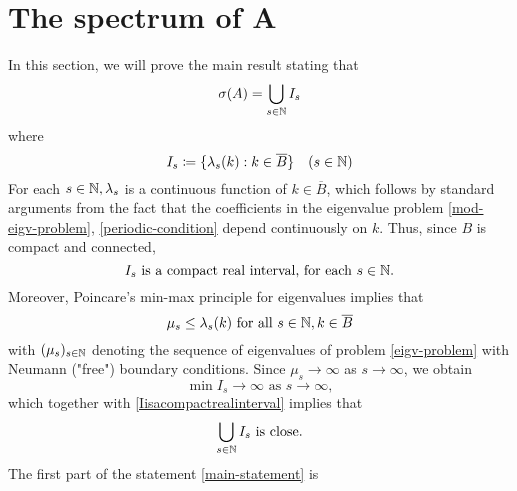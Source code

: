 \chapter{The spectrum of A}	

In this section, we will prove the main result stating that
	\begin{equation}
		\sigma(A) = \bigcup_{s \in \mathbb{N}} I_{s} \label{main-statement}
	\end{equation}
where
	\[ I_{s} \coloneqq \{ \lambda_{s}(k) : k \in \overline{B} \} \quad (s \in \mathbb{N}) \]
For each $s \in \mathbb{N}, \lambda_{s}$ is a continuous function of $k \in \overline{B}$, which follows by standard arguments from the fact that the coefficients in the eigenvalue problem \eqref{mod-eigv-problem},  \eqref{periodic-condition} depend continuously on $k$. Thus, since $B$ is compact and connected, 
	\begin{equation}
		I_{s} \text{ is a compact real interval, for each } s \in \mathbb{N}. \label{Iisacompactrealinterval}
	\end{equation} 
	Moreover, Poincare's min-max principle for eigenvalues implies that
	\[ \mu_{s} \leq \lambda_{s}(k) \text{ for all } s \in \mathbb{N}, k \in \overline{B} \]
	with $(\mu_{s})_{s \in \mathbb{N}}$ denoting the sequence of eigenvalues of problem \eqref{eigv-problem} with Neumann ("free") boundary conditions. Since $\mu_{s} \rightarrow \infty$ as $s \rightarrow \infty$, we obtain 
		\[ \min I_{s} \rightarrow \infty \text{ as } s \rightarrow \infty, \]
	which together with \eqref{Iisacompactrealinterval} implies that
		\[ \bigcup_{s \in \mathbb{N}} I_{s} \text{ is close.}\]
	The first part of the statement \eqref{main-statement} is 
